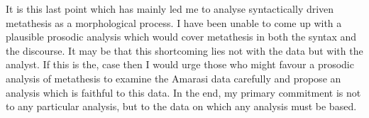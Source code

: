 It is this last point which has mainly led me to analyse
syntactically driven metathesis as a morphological process.
I have been unable to come up with a plausible prosodic analysis
which would cover metathesis in both the syntax and the discourse.
It may be that this shortcoming lies not with the data but with the analyst.
If this is the, case then I would urge those who might favour a prosodic
analysis of metathesis to examine the Amarasi data carefully
and propose an analysis which is faithful to this data.
In the end, my primary commitment is not to any particular analysis,
but to the data on which any analysis must be based.
